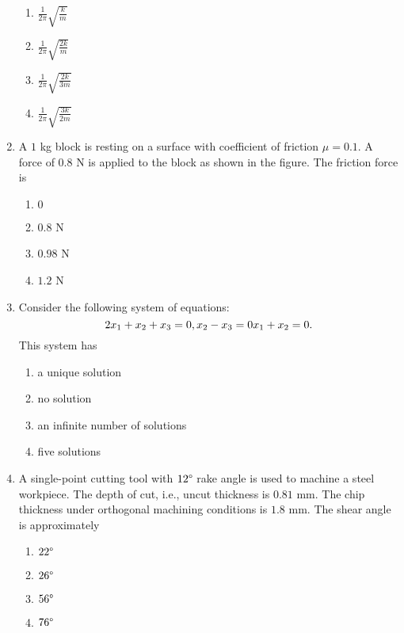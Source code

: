 \documentclass[journal,12pt,twocolumn]{IEEEtran}
\theoremstyle{remark}
\begin{document}
\begin{enumerate}[start=40]
    
    \begin{enumerate}
        \item $\frac{1}{2\pi} \sqrt{\frac{k}{m}}$
        \item $\frac{1}{2\pi} \sqrt{\frac{2k}{m}}$
        \item $\frac{1}{2\pi} \sqrt{\frac{2k}{3m}}$
        \item $\frac{1}{2\pi} \sqrt{\frac{3k}{2m}}$
    \end{enumerate}


    \item A $1$ kg block is resting on a surface with coefficient of friction $\mu= 0.1$. A force of $0.8$ N is applied to the block as shown in the figure. The friction force is
    
    \begin{enumerate}
        \item $0$
        \item $0.8$ N
        \item $0.98$ N
        \item $1.2$ N
    \end{enumerate}

    \item Consider the following system of equations:
    $$
    2x_1 + x_2 + x_3 = 0\\,
    x_2-x_3 = 0\\
 x_1 + x_2 = 0.
    $$
    This system has
    \begin{enumerate}
        \item a unique solution
        \item no solution
        \item an infinite number of solutions
        \item five solutions
    \end{enumerate}


    \item A single-point cutting tool with $12\degree$ rake angle is used to machine a steel workpiece. The depth of cut, i.e., uncut thickness is $0.81$ mm. The chip thickness under orthogonal machining conditions is $1.8$ mm. The shear angle is approximately
    \begin{enumerate}
        \item $22\degree$
        \item $26\degree$
        \item $56\degree$
        \item $76\degree$
    \end{enumerate}


\end{enumerate}
\end{document}
